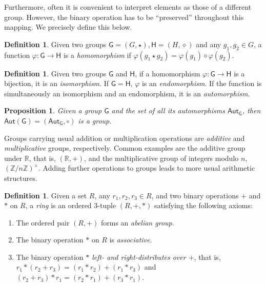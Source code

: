 \documentclass[english]{ufsc-thesis-rn46-2019/ufsc-thesis-rn46-2019}
\newtheorem{proposition}[theorem]{Proposition}
\theoremstyle{definition}
\newtheorem{definition}[theorem]{Definition}
\begin{document}
Furthermore, often it is convenient to interpret elements as those of
a different group. However, the binary operation has to be ``preserved''
throughout this mapping. We precisely define this below.

\begin{definition}\label{def:group-hom}
  Given two groups $\mathsf{G} = (G, \star), \mathsf{H} = (H, \diamond)$ and
  any $g_{1}, g_{2} \in G$, a function $\varphi : \mathsf{G} \to \mathsf{H}$
  is a \emph{homomorphism} if
  $\varphi(g_{1} \star g_{2}) = \varphi(g_{1}) \diamond \varphi(g_{2})$.
\end{definition}

\begin{definition}\label{def:group-iso}
  Given two groups $\mathsf{G}$ and $\mathsf{H}$, if a homomorphism
  $\varphi : \mathsf{G} \to \mathsf{H}$ is a bijection, it is an
  \emph{isomorphism}. If $\mathsf{G} = \mathsf{H}$, $\varphi$ is an
  \emph{endomorphism}. If the function is simultaneously an isomorphism and an
  endomorphism, it is an \emph{automorphism}.
\end{definition}

\begin{proposition}\label{prop:group-aut}
  Given a group $\mathsf{G}$ and the set of all its automorphisms
  $\mathsf{Aut}_{\mathsf{G}}$, then
  $\mathsf{Aut}(\mathsf{G}) = (\mathsf{Aut}_{\mathsf{G}}, \circ)$ is a group.
\end{proposition}

Groups carrying usual addition or multiplication operations are \emph{additive}
and \emph{multiplicative} groups, respectively. Common examples are the
additive group under $\mathbb{R}$, that is, $(\mathbb{R}, +)$, and the
multiplicative group of integers modulo $n$,
${(\mathbb{Z}/n\mathbb{Z})}^{\times}$. Adding further operations to groups
leads to more usual arithmetic structures.

\begin{definition}
  Given a set $R$, any $r_{1}, r_{2}, r_{3} \in R$, and two binary operations
  $+$ and $\ast$ on $R$, a \emph{ring} is an ordered $3$-tuple $(R, +, \ast)$
  satisfying the following axioms:

  \begin{enumerate}
    \item The ordered pair $(R, +)$ forms an \emph{abelian group}.
    \item The binary operation $\ast$ on $R$ is \emph{associative}.
    \item The binary operation \emph{$\ast$ left- and right-distributes over
      $+$}, that is,
      $r_{1} \ast (r_{2} + r_{3}) = (r_{1} \ast r_{2}) + (r_{1} \ast r_{3})$
      and
      $(r_{2} + r_{3}) \ast r_{1} = (r_{2} \ast r_{1}) + (r_{3} \ast r_{1})$.
  \end{enumerate}
\end{definition}
\end{document}
